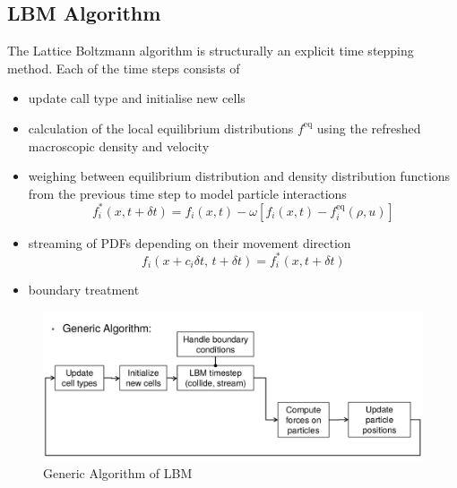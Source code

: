 \subsection{LBM Algorithm} \label{sec:LBM_algorithm}
	The Lattice Boltzmann algorithm is structurally an explicit time stepping method. Each of the time steps consists of
	\begin{itemize}
		\item update call type and initialise new cells
		
		\item calculation of the local equilibrium distributions
		$f^{\mathrm{eq}}$ using the refreshed macroscopic density and velocity
		\item weighing between equilibrium distribution and density
		distribution functions from the previous time step
		to model particle interactions
        \begin{equation}
        f_i^*(x , t + \delta t) = f_i(x, t)
        - \omega [f_i(x, t) - f_i^{\mathrm{eq}}(\rho, u)]
        \end{equation}

		\item streaming of PDFs depending on their movement direction
		\begin{equation}
		f_i(x + c_i \delta t,\, t + \delta t) = f_i^*(x , t + \delta t)
		\end{equation}

		\item boundary treatment
	\end{itemize}
	
	\begin{figure}[ht]
		\centering
		\includegraphics[scale=0.25]{img/LBM/generic_algorithm.png}
		\caption{Generic Algorithm of LBM}
		\label{fig: LBMGeneric_algorithm}
	\end{figure} 
	
